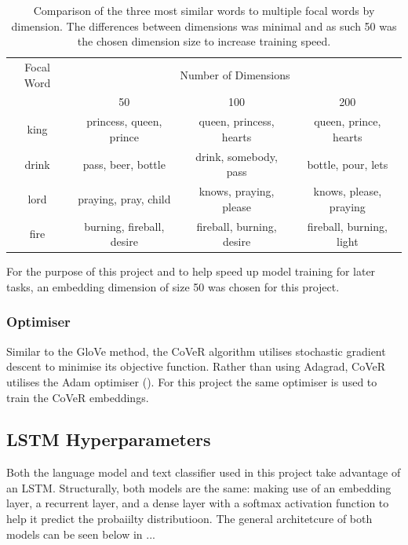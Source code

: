 \begin{table}[htbp]
	\label{Tab:testembeddingdim}
	\begin{center}
		\begin{tabular}{|c|c|c|c|}
			\hline
			{Focal Word}& \multicolumn{3}{p{5cm}|}{\centering Number of Dimensions} \\
			\cline{2-4} & \multicolumn{1}{c|}{50} & \multicolumn{1}{c|}{100} & \multicolumn{1}{c|}{200} \\ \hline
			king & princess, queen, prince & queen, princess, hearts & queen, prince, hearts \\
			drink & pass, beer, bottle & drink, somebody, pass & bottle, pour, lets \\
			lord & praying, pray, child & knows, praying, please & knows, please, praying \\
			fire & burning, fireball, desire & fireball, burning, desire & fireball, burning, light \\
			\hline
		\end{tabular}
	\end{center}
	\caption[Word Similarity by Dimension]{Comparison of the three most similar words to multiple focal words by dimension. The differences between dimensions was minimal and as such 50 was the chosen dimension size to increase training speed.}
\end{table} 

\noindent
For the purpose of this project and to help speed up model training  for later tasks, an embedding dimension of size 50 was chosen for this project.
\subsubsection{Optimiser}
Similar to the GloVe method, the CoVeR algorithm utilises stochastic gradient descent to minimise its objective function. Rather than using Adagrad, CoVeR utilises the Adam optimiser (\cite{Kingma2014}). For this project the same optimiser is used to train the CoVeR embeddings.
\subsection{LSTM Hyperparameters}
Both the language model and text classifier used in this project take advantage of an LSTM. Structurally, both models are the same: making use of an embedding layer, a recurrent layer, and a dense layer with a softmax activation function to help it predict the probaiilty distributioon. The general architetcure of both models can be seen below in ...  

